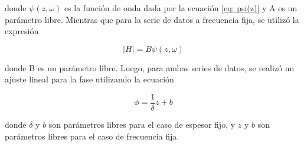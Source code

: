 donde $\psi(z, \omega)$ es la función de onda dada por la ecuación \eqref{eq: psi(z)} y A es un parámetro libre. Mientras que para la serie de datos a frecuencia fija, se utilizó la expresión 

\begin{equation}
    |H| = B \psi(z, \omega)
    \label{eq: modulo-f fijo}
\end{equation}

donde B es un parámetro libre. Luego, para ambas series de datos, se realizó un ajuste lineal para la fase utilizando la ecuación

\begin{equation}
 \phi = \frac{1}{\delta} z + b
 \label{eq: fase-z fijo}
\end{equation} 

donde $\delta$ y $b$ son parámetros libres para el caso de espesor fijo, y $z$ y $b$ son parámetros libres para el caso de frecuencia fija.

